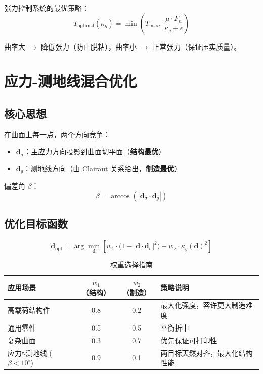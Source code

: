 \documentclass[11pt,a4paper]{article}
\begin{document}
张力控制系统的最优策略：
\begin{equation}
T_{\text{optimal}}(\kappa_g) = \min\left(T_{\max},\; \frac{\mu \cdot F_n}{\kappa_g + \epsilon}\right)
\end{equation}

曲率大 $\to$ 降低张力（防止脱粘），曲率小 $\to$ 正常张力（保证压实质量）。


\section{应力-测地线混合优化}

\subsection{核心思想}

在曲面上每一点，两个方向竞争：
\begin{itemize}[nosep]
\item $\mathbf{d}_\sigma$：主应力方向投影到曲面切平面（\textbf{结构最优}）
\item $\mathbf{d}_g$：测地线方向（由 Clairaut 关系给出，\textbf{制造最优}）
\end{itemize}

偏差角 $\beta$：
\begin{equation}
\beta = \arccos\left(|\mathbf{d}_\sigma \cdot \mathbf{d}_g|\right)
\end{equation}

\subsection{优化目标函数}

\begin{equation}
\boxed{\mathbf{d}_{\text{opt}} = \arg\min_{\mathbf{d}} \left[ w_1 \cdot \big(1 - |\mathbf{d} \cdot \mathbf{d}_\sigma|^2\big) + w_2 \cdot \kappa_g(\mathbf{d})^2 \right]}
\end{equation}

\begin{table}[H]
\centering
\begin{tabularx}{\textwidth}{l c c X}
\toprule
\textbf{应用场景} & $w_1$（结构） & $w_2$（制造） & \textbf{策略说明} \\
\midrule
高载荷结构件 & 0.8 & 0.2 & 最大化强度，容许更大制造难度 \\
通用零件 & 0.5 & 0.5 & 平衡折中 \\
复杂曲面 & 0.3 & 0.7 & 优先保证可打印性 \\
应力≈测地线 ($\beta < 10^\circ$) & 0.9 & 0.1 & 两目标天然对齐，最大化结构性能 \\
\bottomrule
\end{tabularx}
\caption{权重选择指南}
\end{table}
\end{document}
